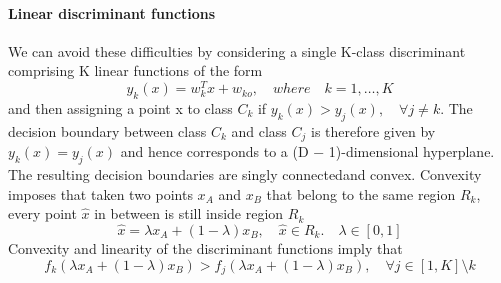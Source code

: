 \documentclass[main.tex]{subfiles}
\begin{document}
\newpage
\paragraph{Linear discriminant functions}
We can avoid these difficulties by considering a single K-class discriminant comprising K linear functions of the form
\begin{equation}
    y_k(x) = w_k^Tx + w_{ko},\quad where \quad k=1,\dots,K
\end{equation}
and then assigning a point x to class $C_k$ if $y_k(x) > y_j (x), \quad \forall j \neq k$. The decision boundary between class $C_k$ and class $C_j$ is therefore given by $y_k(x) = y_j(x)$ and hence corresponds to a (D − 1)-dimensional hyperplane.
The resulting decision boundaries are singly connected\footnotemark and convex. Convexity imposes that taken two points $x_A$ and $x_B$ that belong to the same region $R_k$, every point $\hat{x}$ in between is still inside region $R_k$
\begin{equation*}
    \hat{x} = \lambda x_A + (1-\lambda)x_B, \quad \hat{x}\in R_k. \quad \lambda \in [0, 1]
\end{equation*}
Convexity and linearity of the discriminant functions imply that
\begin{equation*}
    f_k(\lambda x_A + (1-\lambda)x_B) > f_j(\lambda x_A + (1-\lambda)x_B), \quad \forall j \in [1, K] \setminus k
\end{equation*}
\end{document}

